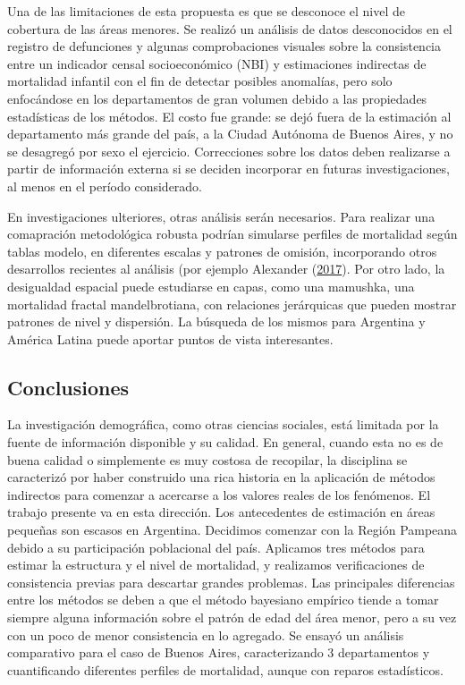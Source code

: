 \documentclass[12pt,]{article}
\begin{document}
Una de las limitaciones de esta propuesta es que se desconoce el nivel
de cobertura de las áreas menores. Se realizó un análisis de datos
desconocidos en el registro de defunciones y algunas comprobaciones
visuales sobre la consistencia entre un indicador censal socioeconómico
(NBI) y estimaciones indirectas de mortalidad infantil con el fin de
detectar posibles anomalías, pero solo enfocándose en los departamentos
de gran volumen debido a las propiedades estadísticas de los métodos. El
costo fue grande: se dejó fuera de la estimación al departamento más
grande del país, a la Ciudad Autónoma de Buenos Aires, y no se desagregó
por sexo el ejercicio. Correcciones sobre los datos deben realizarse a
partir de información externa si se deciden incorporar en futuras
investigaciones, al menos en el período considerado.

En investigaciones ulteriores, otras análisis serán necesarios. Para
realizar una comapración metodológica robusta podrían simularse perfiles
de mortalidad según tablas modelo, en diferentes escalas y patrones de
omisión, incorporando otros desarrollos recientes al análisis (por
ejemplo Alexander (\protect\hyperlink{ref-Alexander2017}{2017}). Por
otro lado, la desigualdad espacial puede estudiarse en capas, como una
mamushka, una mortalidad fractal mandelbrotiana, con relaciones
jerárquicas que pueden mostrar patrones de nivel y dispersión. La
búsqueda de los mismos para Argentina y América Latina puede aportar
puntos de vista interesantes.

\hypertarget{conclusiones}{%
\subsection{Conclusiones}\label{conclusiones}}

La investigación demográfica, como otras ciencias sociales, está
limitada por la fuente de información disponible y su calidad. En
general, cuando esta no es de buena calidad o simplemente es muy costosa
de recopilar, la disciplina se caracterizó por haber construido una rica
historia en la aplicación de métodos indirectos para comenzar a
acercarse a los valores reales de los fenómenos. El trabajo presente va
en esta dirección. Los antecedentes de estimación en áreas pequeñas son
escasos en Argentina. Decidimos comenzar con la Región Pampeana debido a
su participación poblacional del país. Aplicamos tres métodos para
estimar la estructura y el nivel de mortalidad, y realizamos
verificaciones de consistencia previas para descartar grandes problemas.
Las principales diferencias entre los métodos se deben a que el método
bayesiano empírico tiende a tomar siempre alguna información sobre el
patrón de edad del área menor, pero a su vez con un poco de menor
consistencia en lo agregado. Se ensayó un análisis comparativo para el
caso de Buenos Aires, caracterizando 3 departamentos y cuantificando
diferentes perfiles de mortalidad, aunque con reparos estadísticos.
\end{document}
